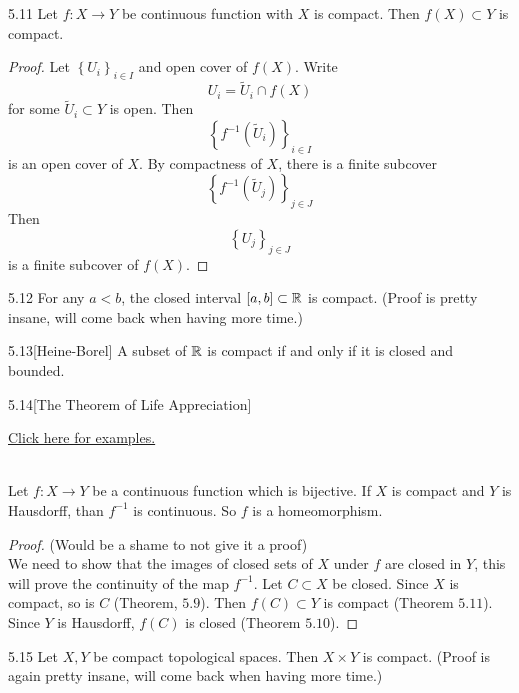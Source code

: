 \begin{customthm}{5.11}
Let $f: X \longrightarrow Y$ be continuous function with $X$ is compact. Then $f(X) \subset Y$ is compact. 
\end{customthm}

\begin{proof}
Let $\left\{U_i\right\}_{i \in I}$ and open cover of $f(X)$. Write 
$$U_i = \widetilde{U}_i \cap f(X)$$
for some $\widetilde{U}_i \subset Y$ is open. Then 
$$\left\{f^{-1}\left(\widetilde{U}_i\right)\right\}_{i \in I}$$
is an open cover of $X$. By compactness of $X$, there is a finite subcover 
$$\left\{f^{-1}\left(\widetilde{U}_j\right)\right\}_{j \in J}$$
Then 
$$\left\{U_j\right\}_{j \in J}$$
is a finite subcover of $f(X)$.
\end{proof}

\begin{customthm}{5.12}
For any $a < b$, the closed interval $[a, b] \subset \mathbb{R}$ is compact. (Proof is pretty insane, will come back when having more time.)
\end{customthm}

\begin{customthm}{5.13}[Heine-Borel]
A subset of $\mathbb{R}$ is compact if and only if it is closed and bounded.
\end{customthm}

\begin{customthm}{5.14}[The Theorem of Life Appreciation]
\hypertarget{Theorem_5.14}{\hyperlink{ex.t.5.14}{Click here for examples.}}\\
Let $f : X \longrightarrow Y$ be a continuous function which is bijective. If $X$ is compact and $Y$ is Hausdorff, than $f^{-1}$ is continuous. So $f$ is a homeomorphism.
\end{customthm}

\begin{proof}(Would be a shame to not give it a proof)\\
We need to show that the images of closed sets of $X$ under $f$ are closed in $Y$, this will prove the continuity of the map $f^{-1}$. Let $C \subset X$ be closed. Since $X$ is compact, so is $C$ (Theorem, $5.9$). Then $f(C) \subset Y$ is compact (Theorem $5.11$). Since $Y$ is Hausdorff, $f(C)$ is closed (Theorem $5.10$).
\end{proof}

\begin{customthm}{5.15} Let $X, Y$ be compact topological spaces. Then $X \times Y$ is compact. (Proof is again pretty insane, will come back when having more time.)
\end{customthm}

